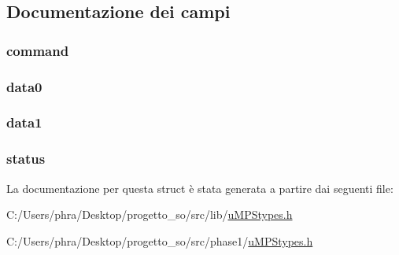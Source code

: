 \subsection{Documentazione dei campi}
\hypertarget{structdtpreg__t_a8538fdce575b580097b18700c560a5a8}{
\subsubsection[{command}]{ command}}\label{structdtpreg__t_a8538fdce575b580097b18700c560a5a8}
\hypertarget{structdtpreg__t_a8a0c321ffd2847534bfd0bc849a972b4}{
\subsubsection[{data0}]{ data0}}\label{structdtpreg__t_a8a0c321ffd2847534bfd0bc849a972b4}
\hypertarget{structdtpreg__t_a6eef7e2e6f5e38b7d153e3f25d6fefb8}{
\subsubsection[{data1}]{ data1}}\label{structdtpreg__t_a6eef7e2e6f5e38b7d153e3f25d6fefb8}
\hypertarget{structdtpreg__t_ae37efb991e613c0dc476ece5ed4ffa71}{
\subsubsection[{status}]{ status}}\label{structdtpreg__t_ae37efb991e613c0dc476ece5ed4ffa71}


La documentazione per questa struct è stata generata a partire dai seguenti file\-:\begin{DoxyCompactItemize}
\item 
C\-:/\-Users/phra/\-Desktop/progetto\-\_\-so/src/lib/\hyperlink{lib_2u_m_p_stypes_8h}{u\-M\-P\-Stypes.\-h}\item 
C\-:/\-Users/phra/\-Desktop/progetto\-\_\-so/src/phase1/\hyperlink{phase1_2u_m_p_stypes_8h}{u\-M\-P\-Stypes.\-h}\end{DoxyCompactItemize}
